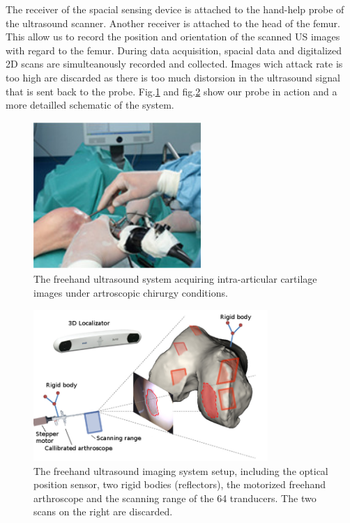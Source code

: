\documentclass[12pt,journal,compsoc]{IEEEtran}
\begin{document}
The receiver of the spacial sensing device is attached to the hand-help probe of the ultrasound scanner. Another receiver is attached to the head of the femur. This allow us to record the position and orientation of the scanned US images with regard to the femur. 
During data acquisition, spacial data and digitalized 2D scans are simulteanously recorded and collected. Images wich attack rate is too high are discarded as there is too much distorsion in the ultrasound signal that is sent back to the probe. Fig.\ref{system1} and fig.\ref{system2} show our probe in action and a more detailled schematic of the system.


\begin{figure}[ht!]
\centering
\includegraphics[width=2.5in]{miticao}
\caption{The freehand ultrasound system acquiring intra-articular cartilage images under artroscopic chirurgy conditions.}
\label{system1}
\end{figure}

\begin{figure}[ht!]
\centering
\includegraphics[width=3.5in]{system}
\caption{The freehand ultrasound imaging system setup, including the optical position sensor, two rigid bodies (reflectors), the motorized freehand arthroscope and the scanning range of the 64 tranducers. The two scans on the right are discarded.}
\label{system2}
\end{figure}
\end{document}
